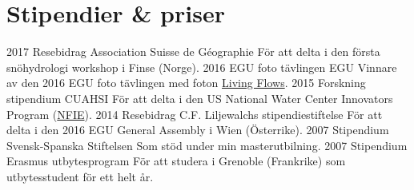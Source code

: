 \ifswedish
    \section{Stipendier \& priser}
    \position
        {2017}
        {Resebidrag}
        {Association Suisse de Géographie}
        {För att delta i den första snöhydrologi workshop i Finse (Norge).}
    \position
        {2016}
        {EGU foto tävlingen}
        {EGU}
        {Vinnare av den 2016 EGU foto tävlingen med foton \href{https://blogs.egu.eu/geolog/2016/08/29/imaggeo-on-mondays-living-flows/}{Living Flows}.}
    \position
        {2015}
        {Forskning stipendium}
        {CUAHSI}
        {För att delta i den US National Water Center Innovators Program  (\href{https://www.cuahsi.org/education/summerinstitute/}{NFIE}).}
    \position
        {2014}
        {Resebidrag}
        {C.F. Liljewalchs stipendiestiftelse}
        {För att delta i den 2016 EGU General Assembly i Wien (Österrike).}
    \position
        {2007}
        {Stipendium}
        {Svensk-Spanska Stiftelsen}
        {Som stöd under min masterutbilning.}
    \position
        {2007}
        {Stipendium}
        {Erasmus utbytesprogram}
        {För att studera i Grenoble (Frankrike) som utbytesstudent för ett helt år.}
\else
